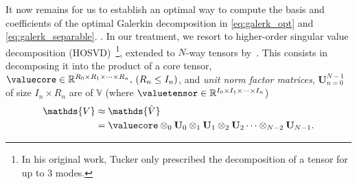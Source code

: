
It now remains for us to establish an optimal way to compute the basis and coefficients of the optimal Galerkin decomposition in \eqref{eq:galerk_opt} and \eqref{eq:galerk_separable}. %
%
. In our treatment, we resort to higher-order singular value decomposition (HOSVD)~\cite{Tucker66}\footnote{In his original work, Tucker only prescribed the decomposition of a tensor for up to 3 modes.}, extended to $N$-way tensors by~\cite{KapteynNWayTensors1986}. This consists in decomposing it into the product of a core tensor, $\valuecore \in \mathbb{R}^{R_0 \times R_1 \times \cdots \times R_n}, \, (R_n \le I_n)$, and \textit{unit norm factor matrices}, $\bm{U}_{n=0}^{N-1}$ of size $I_n \times R_n$ are of  $\mathds{V}$ (where $\valuetensor \in \mathbb{R}^{I_0 \times I_1 \times \cdots \times I_n}$)
%
\begin{subequations}
	\begin{align}
		\mathds{V}  &\approx \mathds{\hat{V}}  \\
		&= \valuecore \otimes_0 \mathbf{U}_0 \otimes_1 \mathbf{U}_1 \otimes_2 \mathbf{U}_2 \cdots \otimes_{N-2} \mathbf{U}_{N-1}.
	\end{align}
	\label{eq:tucker}
\end{subequations}
